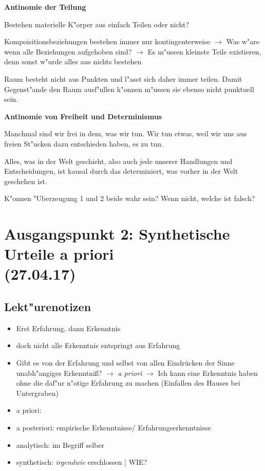 \documentclass[emulatestandardclasses]{scrartcl}
\begin{document}
\textbf{Antinomie der Teilung}

\begin{description}[leftmargin=!,labelwidth=\widthof{\bfseries Contra-Argument}]
  \item[Frage] Bestehen materielle K"orper aus einfach Teilen oder nicht?
  \item[Pro-Argument] Kompoisitionsbeziehungen bestehen immer nur kontingenterweise $\rightarrow$ Was w"are wenn alle Beziehungen aufgehoben sind? $\rightarrow$ Es m"ussen kleinste Teile existieren, denn sonst w"urde alles aus nichts bestehen
  \item[Contra-Argument] Raum besteht nicht aus Punkten und l"asst sich daher immer teilen. Damit Gegenst"ande den Raum ausf"ullen k"onnen m"ussen sie ebenso nicht punktuell sein.
\end{description}
\vspace{9pt}
\noindent \textbf{Antinomie von Freiheit und Determinismus}

\begin{description}[leftmargin=!,labelwidth=\widthof{\bfseries "Uberzeugung 2}]
  \item["Uberzeugung 1] Manchmal sind wir frei in dem, was wir tun. Wir tun
etwas, weil wir uns aus freien St"ucken dazu entschieden haben, es zu tun.
  \item["Uberzeugung 2] Alles, was in der Welt geschieht, also auch jede unserer Handlungen und Entscheidungen, ist kausal durch das determiniert, was vorher in der Welt geschehen ist.
  \item[Frage] K"onnen "Uberzeugung 1 und 2 beide wahr sein? Wenn nicht, welche ist falsch?
\end{description}


\section{Ausgangspunkt 2: Synthetische Urteile a priori\\(27.04.17)}

\subsection{Lekt"urenotizen}

\begin{itemize}
  \item Erst Erfahrung, dann Erkenntnis
  \item doch nicht alle Erkenntnis entspringt aus Erfahrung
  \item Gibt es von der Erfahrung und selbst von allen Eindrücken der Sinne unabh"angiges Erkenntniß? $\rightarrow$ \emph{a priori} $\rightarrow$ Ich kann eine Erkenntnis haben ohne die daf"ur n"otige Erfahrung zu machen (Einfallen des Hauses bei Untergraben)
  \item a priori:
  \item a posteriori: empirische Erkenntnisse/ Erfahrungserkenntnisse
  \item analytisch: im Begriff selber
  \item synthetisch: \emph{irgendwie} erschlossen | WIE?
\end{itemize}
\end{document}
